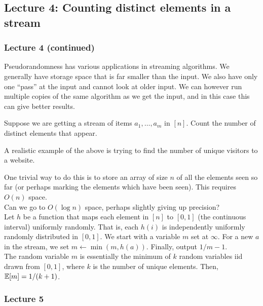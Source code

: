 	\subsection{Lecture 4: Counting distinct elements in a stream}

		\subsubsection{Lecture 4 (continued)}

			Pseudorandomness has various applications in streaming algorithms. We generally have storage space that is far smaller than the input. We also have only one ``pass'' at the input and cannot look at older input. We can however run multiple copies of the same algorithm as we get the input, and in this case this can give better results.

			\begin{problem*}
				Suppose we are getting a stream of items $a_1,\ldots,a_m$ in $[n]$. Count the number of distinct elements that appear.
			\end{problem*}
			A realistic example of the above is trying to find the number of unique visitors to a website.

			One trivial way to do this is to store an array of size $n$ of all the elements seen so far (or perhaps marking the elements which have been seen). This requires $O(n)$ space.\\
			Can we go to $O(\log n)$ space, perhaps slightly giving up precision?\\

			Let $h$ be a function that maps each element in $[n]$ to $[0,1]$ (the continuous interval) uniformly randomly. That is, each $h(i)$ is independently uniformly randomly distributed in $[0,1]$. We start with a variable $m$ set at $\infty$. For a new $a$ in the stream, we set $m \gets \min(m,h(a))$. Finally, output $1/m - 1$.\\
			The random variable $m$ is essentially the minimum of $k$ random variables iid drawn from $[0,1]$, where $k$ is the number of unique elements. Then, $\mathbb{E}[m] = 1/(k+1)$.


		\subsubsection{Lecture 5}

